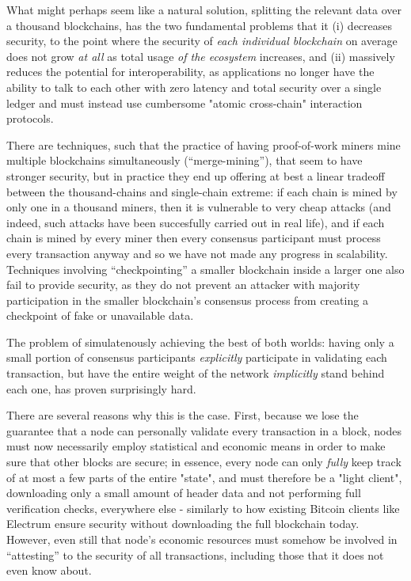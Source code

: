 \documentclass[11pt,a4paper]{article}
\theoremstyle{plain}
\theoremstyle{definition}
\theoremstyle{remark}
\begin{document}
What might perhaps seem like a natural solution, splitting the relevant data over a thousand blockchains, has the two fundamental problems that it (i) decreases security, to the point where the security of \emph{each individual blockchain} on average does not grow \emph{at all} as total usage \emph{of the ecosystem} increases, and (ii) massively reduces the potential for interoperability, as applications no longer have the ability to talk to each other with zero latency and total security over a single ledger and must instead use cumbersome "atomic cross-chain" interaction protocols.\cite{tiernolan}

There are techniques, such that the practice of having proof-of-work miners mine multiple blockchains simultaneously (``merge-mining''), that seem to have stronger security, but in practice they end up offering at best a linear tradeoff between the thousand-chains and single-chain extreme: if each chain is mined by only one in a thousand miners, then it is vulnerable to very cheap attacks\cite{mmpetertodd} (and indeed, such attacks have been succesfully carried out in real life\cite{coiledcoin}), and if each chain is mined by every miner then every consensus participant must process every transaction anyway and so we have not made any progress in scalability. Techniques involving ``checkpointing'' a smaller blockchain inside a larger one also fail to provide security, as they do not prevent an attacker with majority participation in the smaller blockchain's consensus process from creating a checkpoint of fake or unavailable data.\cite{factompetertodd}

The problem of simulatenously achieving the best of both worlds: having only a small portion of consensus participants \emph{explicitly} participate in validating each transaction, but have the entire weight of the network \emph{implicitly} stand behind each one, has proven surprisingly hard.

There are several reasons why this is the case. First, because we lose the guarantee that a node can personally validate every transaction in a block, nodes must now necessarily employ statistical and economic means in order to make sure that other blocks are secure; in essence, every node can only \emph{fully} keep track of at most a few parts of the entire "state", and must therefore be a "light client", downloading only a small amount of header data and not performing full verification checks, everywhere else - similarly to how existing Bitcoin clients like Electrum\cite{electrum} ensure security without downloading the full blockchain today. However, even still that node's economic resources must somehow be involved in ``attesting'' to the security of all transactions, including those that it does not even know about.
\end{document}
